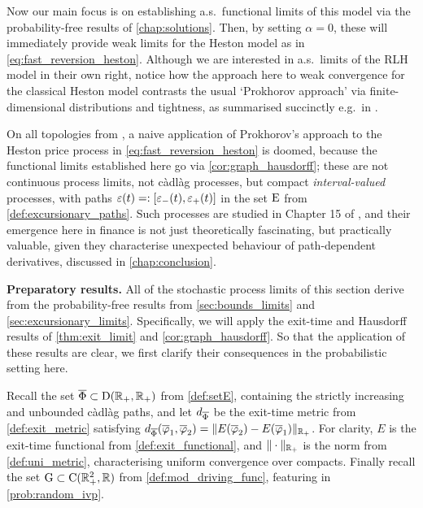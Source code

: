 Now our main focus is on establishing a.s.~functional limits of this model via the probability-free results of \autoref{chap:solutions}. Then, by setting $\alpha=0$, these will immediately provide weak limits for the Heston model as in \autoref{eq:fast_reversion_heston}. Although we are interested in a.s.~limits of the RLH model in their own right, notice how the approach here to weak convergence for the classical Heston model contrasts the usual `Prokhorov approach' via finite-dimensional distributions and tightness, as summarised succinctly e.g.~in \cite{jacod_2003}.

On all topologies from \cite{skorokhod_1956}, a naive application of Prokhorov's approach to the Heston price process in \autoref{eq:fast_reversion_heston} is doomed, because the functional limits established here go via \autoref{cor:graph_hausdorff}; these are not continuous process limits, not c\`adl\`ag processes, but compact \emph{interval-valued} processes, with paths $\varepsilon(t)=:[\varepsilon_-(t),\varepsilon_+(t)]$ in the set $\mathrm{E}$ from \autoref{def:excursionary_paths}. Such processes are studied in Chapter 15 of \cite{whitt_2002}, and their emergence here in finance is not just theoretically fascinating, but practically valuable, given they characterise unexpected behaviour of path-dependent derivatives, discussed in \autoref{chap:conclusion}.

\vspace{3mm}\textbf{Preparatory results.} All of the stochastic process limits of this section derive from the probability-free results from \autoref{sec:bounds_limits} and \autoref{sec:excursionary_limits}. Specifically, we will apply the exit-time and Hausdorff results of \autoref{thm:exit_limit} and \autoref{cor:graph_hausdorff}. So that the application of these results are clear, we first clarify their consequences in the probabilistic setting here.

Recall the set $\overline{\Phi}\subset\mathrm{D}(\mathbb{R}_+,\mathbb{R}_+)$ from \autoref{def:setE}, containing the strictly increasing and unbounded c\`adl\`ag paths, and let $d_{\overline{\Phi}}$ be the exit-time metric from \autoref{def:exit_metric} satisfying $d_{\overline{\Phi}}(\overline{\varphi}_1,\overline{\varphi}_2) = \Vert E(\overline{\varphi}_2) - E(\overline{\varphi}_1)\Vert_{\mathbb{R}_+}$. For clarity, $E$ is the exit-time functional from \autoref{def:exit_functional}, and $\Vert\cdot\Vert_{\mathbb{R}_+}$ is the norm from \autoref{def:uni_metric}, characterising uniform convergence over compacts. Finally recall the set $\mathrm{G}\subset\mathrm{C}(\mathbb{R}_+^2,\mathbb{R})$ from \autoref{def:mod_driving_func}, featuring in \autoref{prob:random_ivp}.

